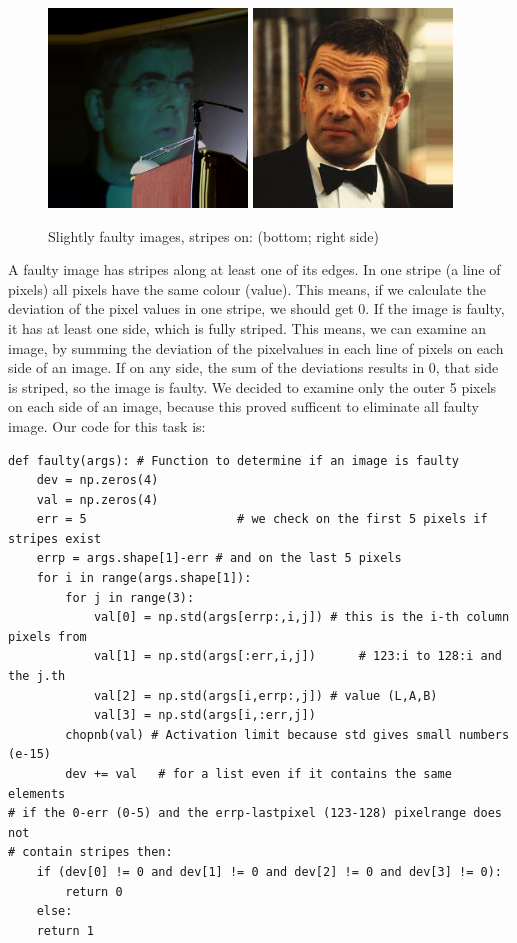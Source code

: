 \documentclass[12pt]{article}
\begin{document}
\begin{figure}[H]
	\centering
	\captionsetup{justification=centering}
	\includegraphics[height=150pt]{faulty3}
	\hspace{60pt}
	\includegraphics[height=150pt]{faulty4}
	\caption{Slightly faulty images, stripes on: (bottom; right side)}	
	\label{fig:stripe_slight}
\end{figure}
\noindent A faulty image has stripes along at least one of its edges. In one stripe (a line of pixels) all pixels have the same colour (value). This means, if we calculate the deviation of the pixel values in one stripe, we should get 0. If the image is faulty, it has at least one side, which is fully striped. This means, we can examine an image, by summing the deviation of the pixelvalues in each line of pixels on each side of an image. If on any side, the sum of the deviations results in 0, that side is striped, so the image is faulty.
\newline\newline
We decided to examine only the outer 5 pixels on each side of an image, because this proved sufficent to eliminate all faulty image. Our code for this task is:

\lstset{language=Python}
\begin{lstlisting}
def faulty(args): # Function to determine if an image is faulty
	dev = np.zeros(4)  
	val = np.zeros(4)  
	err = 5                     # we check on the first 5 pixels if stripes exist
	errp = args.shape[1]-err # and on the last 5 pixels
	for i in range(args.shape[1]):
		for j in range(3):
			val[0] = np.std(args[errp:,i,j]) # this is the i-th column pixels from 
			val[1] = np.std(args[:err,i,j])      # 123:i to 128:i and the j.th 
			val[2] = np.std(args[i,errp:,j]) # value (L,A,B)
			val[3] = np.std(args[i,:err,j])
		chopnb(val) # Activation limit because std gives small numbers (e-15) 
		dev += val   # for a list even if it contains the same elements 
# if the 0-err (0-5) and the errp-lastpixel (123-128) pixelrange does not 
# contain stripes then:
	if (dev[0] != 0 and dev[1] != 0 and dev[2] != 0 and dev[3] != 0):
		return 0
	else:
	return 1
\end{lstlisting}
\end{document}
